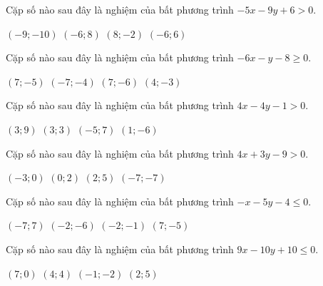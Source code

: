 \begin{ex}
 Cặp số nào sau đây là nghiệm của bất phương trình $- 5 x - 9 y + 6 > 0$.
 
\choice
{ \True $(-9; -10)$ }
   { $(-6; 8)$ }
     { $(8; -2)$ }
    { $(-6; 6)$ }
\end{ex}

\begin{ex}
 Cặp số nào sau đây là nghiệm của bất phương trình $- 6 x - y - 8 \ge 0$.
 
\choice
{ $(7; -5)$ }
   { \True $(-7; -4)$ }
     { $(7; -6)$ }
    { $(4; -3)$ }
\end{ex}

\begin{ex}
 Cặp số nào sau đây là nghiệm của bất phương trình $4 x - 4 y - 1 > 0$.
 
\choice
{ $(3; 9)$ }
   { $(3; 3)$ }
     { $(-5; 7)$ }
    { \True $(1; -6)$ }
\end{ex}

\begin{ex}
 Cặp số nào sau đây là nghiệm của bất phương trình $4 x + 3 y - 9 > 0$.
 
\choice
{ $(-3; 0)$ }
   { $(0; 2)$ }
     { \True $(2; 5)$ }
    { $(-7; -7)$ }
\end{ex}

\begin{ex}
 Cặp số nào sau đây là nghiệm của bất phương trình $- x - 5 y - 4 \le 0$.

 
\choice
{ \True $(-7; 7)$ }
   { $(-2; -6)$ }
     { $(-2; -1)$ }
    { $(7; -5)$ }
\end{ex}

\begin{ex}
 Cặp số nào sau đây là nghiệm của bất phương trình $9 x - 10 y + 10 \le 0$.

 
\choice
{ $(7; 0)$ }
   { $(4; 4)$ }
     { $(-1; -2)$ }
    { \True $(2; 5)$ }
\end{ex}

